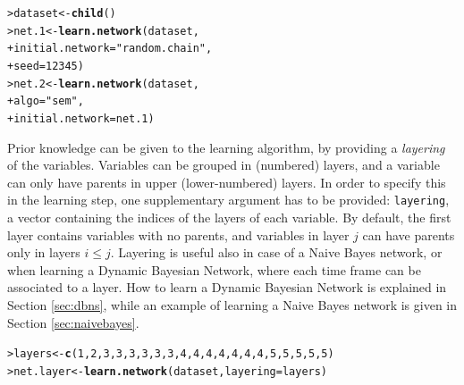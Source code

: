 \documentclass{article}\usepackage[]{graphicx}\usepackage[]{color}
\makeatletter
\newcommand{\hlnum}[1]{\textcolor[rgb]{0.686,0.059,0.569}{#1}}%
\newcommand{\hlstr}[1]{\textcolor[rgb]{0.192,0.494,0.8}{#1}}%
\newcommand{\hlstd}[1]{\textcolor[rgb]{0.345,0.345,0.345}{#1}}%
\newcommand{\hlkwb}[1]{\textcolor[rgb]{0.69,0.353,0.396}{#1}}%
\newcommand{\hlkwc}[1]{\textcolor[rgb]{0.333,0.667,0.333}{#1}}%
\newcommand{\hlkwd}[1]{\textcolor[rgb]{0.737,0.353,0.396}{\textbf{#1}}}%
\newenvironment{kframe}{%
 \def\at@end@of@kframe{}%
 \ifinner\ifhmode%
  \def\at@end@of@kframe{\end{minipage}}%
  \begin{minipage}{\columnwidth}%
 \fi\fi%
 \def\FrameCommand##1{\hskip\@totalleftmargin \hskip-\fboxsep
 \colorbox{shadecolor}{##1}\hskip-\fboxsep
     \hskip-\linewidth \hskip-\@totalleftmargin \hskip\columnwidth}%
 \MakeFramed {\advance\hsize-\width
   \@totalleftmargin\z@ \linewidth\hsize
   \@setminipage}}%
 {\par\unskip\endMakeFramed%
 \at@end@of@kframe}
\newenvironment{knitrout}{}{} %
\makeatother
\begin{document}
\begin{knitrout}
\color{fgcolor}\begin{kframe}
\begin{alltt}
\hlstd{> }\hlstd{dataset} \hlkwb{<-} \hlkwd{child}\hlstd{()}
\hlstd{> }\hlstd{net.1}   \hlkwb{<-} \hlkwd{learn.network}\hlstd{(dataset,}
\hlstd{+ }                         \hlkwc{initial.network} \hlstd{=} \hlstr{"random.chain"}\hlstd{,}
\hlstd{+ }                         \hlkwc{seed} \hlstd{=} \hlnum{12345}\hlstd{)}
\hlstd{> }\hlstd{net.2}   \hlkwb{<-} \hlkwd{learn.network}\hlstd{(dataset,}
\hlstd{+ }                         \hlkwc{algo} \hlstd{=} \hlstr{"sem"}\hlstd{,}
\hlstd{+ }                         \hlkwc{initial.network} \hlstd{= net.1)}
\end{alltt}
\end{kframe}
\end{knitrout}

Prior knowledge can be given to the learning algorithm, by providing a \textit{layering} of the variables.
Variables can be grouped in (numbered) layers, and a variable can only have parents in upper (lower-numbered) layers. In order to specify this in the learning step, one supplementary argument has to be provided: \texttt{layering}, a vector containing the indices of the layers of each variable. By default, the first layer contains variables with no parents, and variables in layer $j$ can have parents only in layers $i \leq j$.
Layering is useful also in case of a Naive Bayes network, or when learning a Dynamic Bayesian Network,
where each time frame can be associated to a layer. How to learn a Dynamic Bayesian Network is explained in Section \ref{sec:dbns},
while an example of learning a Naive Bayes network is given in Section \ref{sec:naivebayes}.
\begin{knitrout}
\color{fgcolor}\begin{kframe}
\begin{alltt}
\hlstd{> }\hlstd{layers} \hlkwb{<-} \hlkwd{c}\hlstd{(}\hlnum{1}\hlstd{,}\hlnum{2}\hlstd{,}\hlnum{3}\hlstd{,}\hlnum{3}\hlstd{,}\hlnum{3}\hlstd{,}\hlnum{3}\hlstd{,}\hlnum{3}\hlstd{,}\hlnum{3}\hlstd{,}\hlnum{4}\hlstd{,}\hlnum{4}\hlstd{,}\hlnum{4}\hlstd{,}\hlnum{4}\hlstd{,}\hlnum{4}\hlstd{,}\hlnum{4}\hlstd{,}\hlnum{4}\hlstd{,}\hlnum{5}\hlstd{,}\hlnum{5}\hlstd{,}\hlnum{5}\hlstd{,}\hlnum{5}\hlstd{,}\hlnum{5}\hlstd{)}
\hlstd{> }\hlstd{net.layer} \hlkwb{<-} \hlkwd{learn.network}\hlstd{(dataset,} \hlkwc{layering} \hlstd{= layers)}
\end{alltt}
\end{kframe}
\end{knitrout}
\end{document}
